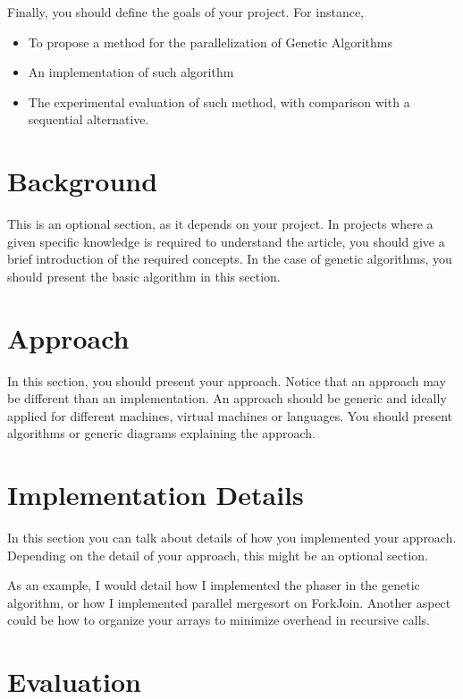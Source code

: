 \documentclass[runningheads]{llncs}
\begin{document}
Finally, you should define the goals of your project. For instance,

\begin{itemize}
	\item To propose a method for the parallelization of Genetic Algorithms
	\item An implementation of such algorithm
	\item The experimental evaluation of such method, with comparison with a sequential alternative.
\end{itemize}


\section{Background}

This is an optional section, as it depends on your project. In projects where a given specific knowledge is required to understand the article, you should give a brief introduction of the required concepts. In the case of genetic algorithms, you should present the basic algorithm in this section.


\section{Approach}

In this section, you should present your approach. Notice that an approach may be different than an implementation. An approach should be generic and ideally applied for different machines, virtual machines or languages. You should present algorithms or generic diagrams explaining the approach.

\section{Implementation Details}

In this section you can talk about details of how you implemented your approach. Depending on the detail of your approach, this might be an optional section.

As an example, I would detail how I implemented the phaser in the genetic algorithm, or how I implemented parallel mergesort on ForkJoin. Another aspect could be how to organize your arrays to minimize overhead in recursive calls.


\section{Evaluation}
\end{document}
